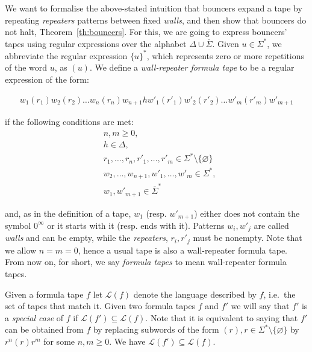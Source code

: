 We want to formalise the above-stated intuition that bouncers expand a tape by repeating \textit{repeaters} patterns between fixed \textit{walls}, and then show that bouncers do not halt, Theorem~\ref{th:bouncers}. For this, we are going to express bouncers' tapes using regular expressions over the alphabet $\Delta \cup  \overline{\Sigma}$. Given $u\in\Sigma^*$, we abbreviate the regular expression $\{u\}^*$, which represents zero or more repetitions of the word $u$, as $(u)$. We define a \textit{wall-repeater formula tape} to be a regular expression of the form:

\begin{align}\label{math:formulaTapes}w_1(r_1)w_2(r_2)\dots w_n(r_n) w_{n+1} h w'_1(r'_1)w'_2(r'_2)\dots w'_m(r'_m) w'_{m+1}\end{align}

if the following conditions are met:
\begin{align*}
     & n,m \geq 0,                                                            \\
     & h \in \Delta,                                                          \\
     & r_1,\dots,r_n,r'_1,\dots,r'_m \in \Sigma^* \setminus \{ \varnothing \} \\
     & w_2,\dots,w_{n+1},w'_1,\dots,w'_m \in \Sigma^*,                        \\
     & w_1, w'_{m+1} \in  \overline{\Sigma}^*
\end{align*}

and, as in the definition of a tape, $w_1$ (resp. $w'_{m+1}$) either does not contain the symbol $0^\infty$ or it starts with it (resp. ends with it). Patterns $w_i, w'_j$ are called \textit{walls} and can be empty, while the \textit{repeaters}, $r_i, r'_j$ must be nonempty. Note that we allow $n=m=0$, hence a usual tape is also a wall-repeater formula tape. From now on, for short, we say \textit{formula tapes} to mean wall-repeater formula tapes.

Given a formula tape $f$ let $\mathcal{L}(f)$ denote the language described by $f$, i.e.\ the set of tapes that match it. Given two formula tapes $f$ and $f'$ we will say that $f'$ is a \textit{special case} of $f$ if $\mathcal{L}(f') \subseteq \mathcal{L}(f)$. Note that it is equivalent to saying that $f'$ can be obtained from $f$ by replacing subwords of the form $(r), r\in\Sigma^*\setminus\{\varnothing\}$ by $r^n(r)r^m$ for some $n,m\geq 0$. We have $\mathcal{L}(f') \subseteq \mathcal{L}(f)$.

